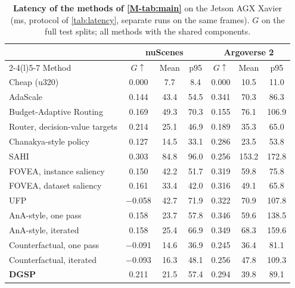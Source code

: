 \documentclass[10pt,letterpaper]{article}
\newcommand{\method}{DGSP\xspace}
\newcommand{\G}{G}
\newcommand{\oursrow}{\rowcolor{oursbg}}
\theoremstyle{remark}
\theoremstyle{plain}
\theoremstyle{definition}
\begin{document}
\begin{table}[!tbp]
\centering
\caption{\textbf{Latency of the methods of \cref*{M-tab:main}} on the Jetson AGX Xavier (ms, protocol of \cref{tab:latency}, separate runs on the same frames). $\G$ on the full test splits; all methods with the shared components.}
\label{tab:latency_baselines}
\small
\setlength{\tabcolsep}{2.4pt}
\begin{tabular}{@{}lcccccc@{}}
\toprule
 & \multicolumn{3}{c}{nuScenes} & \multicolumn{3}{c}{Argoverse 2} \\
\cmidrule(lr){2-4}\cmidrule(l){5-7}
Method & $\G\uparrow$ & Mean & p95 & $\G\uparrow$ & Mean & p95 \\
\midrule
Cheap (u320) & 0.000 & 7.7 & 8.4 & 0.000 & 10.5 & 11.0 \\
AdaScale & 0.144 & 43.4 & 54.5 & 0.341 & 70.3 & 86.3 \\
Budget-Adaptive Routing & 0.169 & 49.3 & 70.3 & 0.155 & 76.1 & 106.9 \\
Router, decision-value targets & 0.214 & 25.1 & 46.9 & 0.189 & 35.3 & 65.0 \\
Chanakya-style policy & 0.127 & 14.5 & 33.1 & 0.286 & 23.5 & 53.8 \\
SAHI & 0.303 & 84.8 & 96.0 & 0.256 & 153.2 & 172.8 \\
FOVEA, instance saliency & 0.150 & 42.2 & 51.7 & 0.319 & 59.8 & 75.8 \\
FOVEA, dataset saliency & 0.161 & 33.4 & 42.0 & 0.316 & 49.1 & 65.8 \\
UFP & $-$0.058 & 42.7 & 71.9 & 0.322 & 70.9 & 107.8 \\
AnA-style, one pass & 0.158 & 23.7 & 57.8 & 0.346 & 59.6 & 138.5 \\
AnA-style, iterated & 0.158 & 25.4 & 66.9 & 0.349 & 68.3 & 159.6 \\
Counterfactual, one pass & $-$0.091 & 14.6 & 36.9 & 0.245 & 36.4 & 81.1 \\
Counterfactual, iterated & $-$0.093 & 16.3 & 48.1 & 0.256 & 47.8 & 109.3 \\
\midrule
\oursrow \textbf{\method} & 0.211 & 21.5 & 57.4 & 0.294 & 39.8 & 89.1 \\
\bottomrule
\end{tabular}
\end{table}
\end{document}
